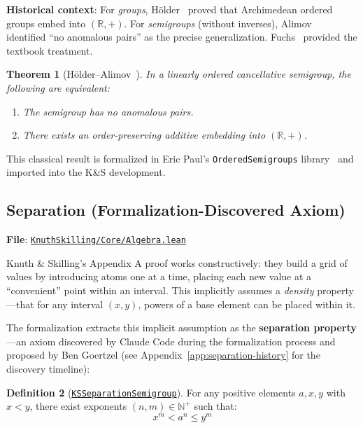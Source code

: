 \documentclass[11pt]{article}
\newtheorem{theorem}{Theorem}[section]
\theoremstyle{definition}
\newtheorem{definition}[theorem]{Definition}
\theoremstyle{remark}
\begin{document}
\textbf{Historical context}: For \emph{groups}, H\"older~\cite{Holder1901} proved that Archimedean ordered groups
embed into $(\mathbb{R}, +)$. For \emph{semigroups} (without inverses), Alimov~\cite{Alimov1950} identified
``no anomalous pairs'' as the precise generalization. Fuchs~\cite{Fuchs1963} provided the textbook treatment.

\begin{theorem}[H\"older--Alimov~\cite{Holder1901,Alimov1950,Fuchs1963}]
\label{thm:holder-alimov}
In a linearly ordered cancellative semigroup, the following are equivalent:
\begin{enumerate}
\item The semigroup has no anomalous pairs.
\item There exists an order-preserving additive embedding into $(\mathbb{R}, +)$.
\end{enumerate}
\end{theorem}

This classical result is formalized in Eric Paul's \texttt{OrderedSemigroups} library~\cite{Paul2024} and imported
into the K\&S development.

\subsection{Separation (Formalization-Discovered Axiom)}
\label{subsec:separation}

\textbf{File}: \href{https://github.com/zariuq/ks-foundations-of-inference/blob/main/KnuthSkilling/Core/Algebra.lean}{\texttt{KnuthSkilling/Core/Algebra.lean}}

Knuth \& Skilling's Appendix A proof works constructively: they build a grid of values by introducing
atoms one at a time, placing each new value at a ``convenient'' point within an interval. This
implicitly assumes a \emph{density} property---that for any interval $(x, y)$, powers of a base
element can be placed within it.

The formalization extracts this implicit assumption as the \textbf{separation property}---an axiom
discovered by Claude Code during the formalization process and proposed by Ben Goertzel
(see Appendix~\ref{app:separation-history} for the discovery timeline):

\begin{definition}[\href{https://github.com/zariuq/ks-foundations-of-inference/blob/main/KnuthSkilling/Core/Algebra.lean\#L335}{\texttt{KSSeparationSemigroup}}]
\label{def:separation}
For any positive elements $a, x, y$ with $x < y$, there exist exponents $(n, m) \in \mathbb{N}^+$
such that:
\[
  x^m < a^n \leq y^m
\]
\end{definition}
\end{document}
